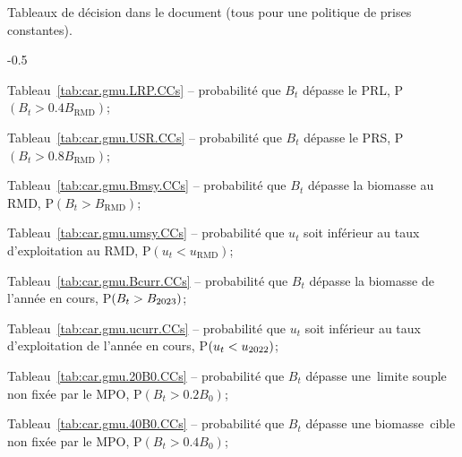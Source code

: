 \documentclass[11pt]{book}
\newcommand{\Bmsy}{B_\text{RMD}}
\newcommand{\umsy}{u_\text{RMD}}
\newcommand{\angL}{\guillemotleft\,}
\newcommand{\angR}{\,\guillemotright}
\begin{document}
Tableaux de d\'{e}cision dans le document (tous pour une politique de prises constantes). \begin{itemize_csas}{-0.5}{}
\item Tableau~\ref{tab:car.gmu.LRP.CCs} -- probabilit\'{e} que $B_t$ d\'{e}passe le PRL, P$(B_t > 0.4 \Bmsy)$; %
\item Tableau~\ref{tab:car.gmu.USR.CCs} -- probabilit\'{e} que $B_t$ d\'{e}passe le PRS, P$(B_t > 0.8 \Bmsy)$; %
\item Tableau~\ref{tab:car.gmu.Bmsy.CCs} -- probabilit\'{e} que $B_t$ d\'{e}passe la biomasse au RMD, P$(B_t > \Bmsy)$; %
\item Tableau~\ref{tab:car.gmu.umsy.CCs} -- probabilit\'{e} que $u_t$ soit inf\'{e}rieur au taux d'exploitation au RMD, P$(u_t < \umsy)$; %
\item Tableau~\ref{tab:car.gmu.Bcurr.CCs} -- probabilit\'{e} que $B_t$ d\'{e}passe la biomasse de l'ann\'{e}e en cours, P$(B_t > B_{2023})$; %
\item Tableau~\ref{tab:car.gmu.ucurr.CCs} -- probabilit\'{e} que $u_t$ soit inf\'{e}rieur au taux d'exploitation de l'ann\'{e}e en cours, P$(u_t < u_{2022})$; %
\item Tableau~\ref{tab:car.gmu.20B0.CCs} -- probabilit\'{e} que $B_t$ d\'{e}passe une \angL{}limite souple\angR{} non fix\'{e}e par le MPO, P$(B_t > 0.2 B_0)$; %
\item Tableau~\ref{tab:car.gmu.40B0.CCs} -- probabilit\'{e} que $B_t$ d\'{e}passe une biomasse \angL{}cible\angR{} non fix\'{e}e par le MPO, P$(B_t > 0.4 B_0)$; %
\end{itemize_csas}
\end{document}
